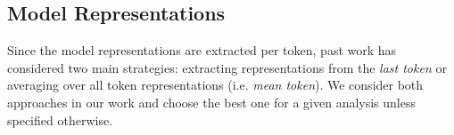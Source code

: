 \subsection{Model Representations}
Since the model representations are extracted per token, past work has considered two main strategies: extracting representations from the \textit{last token} or averaging over all token representations (i.e. \textit{mean token}). We consider both approaches in our work and choose the best one for a given analysis unless specified otherwise.

